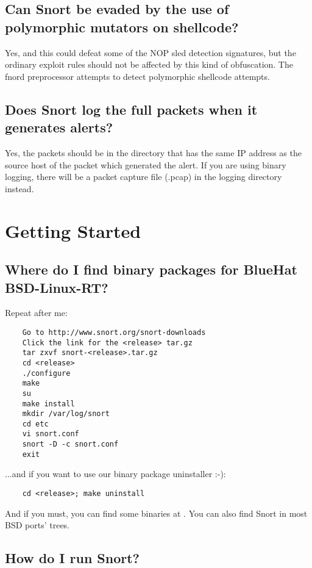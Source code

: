 \documentclass{article}
\begin{document}
\subsection{Can Snort be evaded by the use of polymorphic mutators on shellcode?}

Yes, and this could defeat some of the NOP sled detection signatures,
but the ordinary exploit rules should not be affected by this kind
of obfuscation.  The fnord preprocessor attempts to detect polymorphic
shellcode attempts.

\subsection{Does Snort log the full packets when it generates alerts? }

Yes, the packets should be in the directory that has the same IP address as the
source host of the packet which generated the alert. If you are using binary
logging, there will be a packet capture file (.pcap) in the logging directory
instead.
  
\section{Getting Started}

\subsection{Where do I find binary packages for BlueHat BSD-Linux-RT?}

Repeat after me:

\begin{verbatim}
    Go to http://www.snort.org/snort-downloads
    Click the link for the <release> tar.gz
    tar zxvf snort-<release>.tar.gz
    cd <release>
    ./configure
    make
    su
    make install
    mkdir /var/log/snort
    cd etc
    vi snort.conf
    snort -D -c snort.conf
    exit
\end{verbatim}

...and if you want to use our binary package uninstaller :-):
\begin{verbatim}
    cd <release>; make uninstall
\end{verbatim}

And if you must, you can find some binaries at . 
You can also find Snort in most BSD ports' trees.

\subsection{How do I run Snort?}
\end{document}
